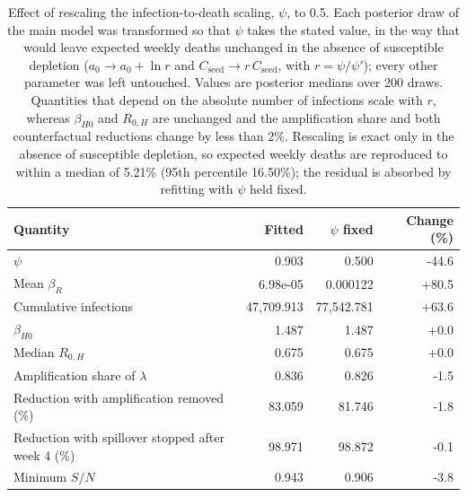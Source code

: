 \begin{table}[htbp]
\centering
\caption{Effect of rescaling the infection-to-death scaling, $\psi$, to 0.5. Each posterior draw of the main model was transformed so that $\psi$ takes the stated value, in the way that would leave expected weekly deaths unchanged in the absence of susceptible depletion ($a_0 \rightarrow a_0 + \ln r$ and $C_{\mathrm{seed}} \rightarrow r\,C_{\mathrm{seed}}$, with $r = \psi/\psi'$); every other parameter was left untouched. Values are posterior medians over 200 draws. Quantities that depend on the absolute number of infections scale with $r$, whereas $\beta_{H0}$ and $R_{0,H}$ are unchanged and the amplification share and both counterfactual reductions change by less than 2\%. Rescaling is exact only in the absence of susceptible depletion, so expected weekly deaths are reproduced to within a median of 5.21\% (95th percentile 16.50\%); the residual is absorbed by refitting with $\psi$ held fixed.}
\label{tab:si_psi_sensitivity}
\begin{tabularx}{\textwidth}{Xrrr}
\toprule
Quantity & Fitted & $\psi$ fixed & Change (\%) \\
\midrule
$\psi$ & 0.903 & 0.500 & -44.6 \\
Mean $\beta_R$ & 6.98e-05 & 0.000122 & +80.5 \\
Cumulative infections & 47,709.913 & 77,542.781 & +63.6 \\
$\beta_{H0}$ & 1.487 & 1.487 & +0.0 \\
Median $R_{0,H}$ & 0.675 & 0.675 & +0.0 \\
Amplification share of $\lambda$ & 0.836 & 0.826 & -1.5 \\
Reduction with amplification removed (\%) & 83.059 & 81.746 & -1.8 \\
Reduction with spillover stopped after week 4 (\%) & 98.971 & 98.872 & -0.1 \\
Minimum $S/N$ & 0.943 & 0.906 & -3.8 \\
\bottomrule
\end{tabularx}
\end{table}
